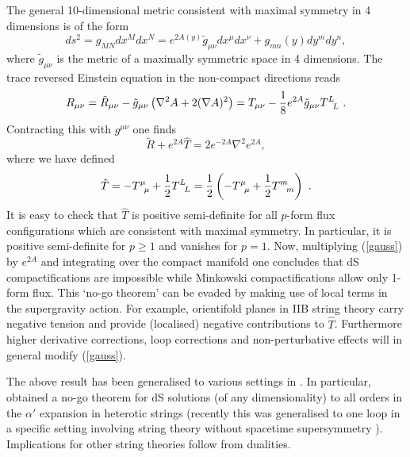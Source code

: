 The general 10-dimensional metric consistent with maximal symmetry in 4 dimensions is of the form
$$ 
  ds^{2} = g_{MN} dx^{M} dx^{N} = e^{2A(y)} \tilde{g}_{\mu \nu} dx^{\mu} dx^{\nu} + g_{mn}(y) dy^{m} dy^{n},
$$
where $\tilde{g}_{\mu \nu}$ is the metric of a maximally symmetric space in 4 dimensions. The trace reversed Einstein equation in the non-compact directions reads
\begin{equation}
 R_{\mu \nu} = \tilde{R}_{\mu \nu} - \tilde{g}_{\mu \nu} \left( \nabla^{2} A + 2 ( \nabla A)^{2} \right) = T_{\mu \nu} - {1 \over 8} e^{2A} \tilde{g}_{\mu \nu} T^{L}_{\phantom{L} L} \ .
\end{equation}
Contracting this with $g^{\mu \nu}$ one finds
\begin{equation}
\label{gauss}
  \tilde{R} + e^{2A} \hat{T} = 2 e^{-2A} \nabla^{2}  e^{2A},
\end{equation}
where we have defined
\begin{equation}
\label{hatT}
  \hat{T} =  - T^{\mu}_{\phantom{\mu} \mu} + {1 \over 2} T^{L}_{\phantom{L} L}
   = {1 \over 2} \left( - T^{\mu}_{\phantom{\mu} \mu} + {1 \over 2} T^{m}_{\phantom{m} m} \right) \ .
\end{equation}
It is easy to check that $\hat{T}$ is positive semi-definite for all $p$-form flux configurations which are consistent with maximal symmetry. In particular, it is positive semi-definite for $p \geq 1$ and vanishes for $p=1$. Now, multiplying (\ref{gauss}) by $e^{2A}$ and integrating over the compact manifold one concludes that dS compactifications are impossible while Minkowski compactifications allow only 1-form flux. This `no-go theorem' can be evaded by making use of local terms in the supergravity action. For example, orientifold planes in IIB string theory carry negative tension and provide  (localised) negative contributions to $\hat{T}$. Furthermore higher derivative corrections, loop corrections and non-perturbative effects will in general modify (\ref{gauss}). 

The above result has been generalised to various settings in  \cite{Hertzberg:2007wc, Green:2011cn, Gautason:2012tb, Quigley:2015jia, Kutasov:2015eba, Basile:2020mpt, Andriot:2022xjh}.
In particular,  \cite{Kutasov:2015eba} obtained a no-go theorem for dS solutions (of any dimensionality) to all orders in the $\alpha'$ expansion
in heterotic strings  (recently this was generalised to one loop in a specific setting involving string theory without spacetime supersymmetry \cite{Baykara:2022cwj}). Implications for other string theories follow from dualities. 

